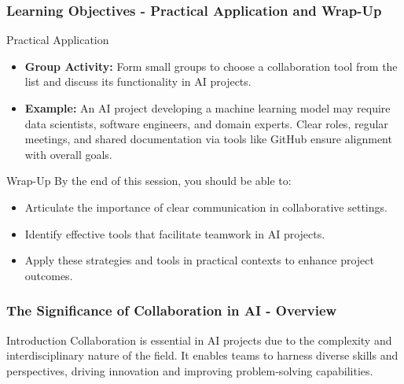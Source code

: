 \documentclass[aspectratio=169]{beamer}
\begin{document}
\begin{frame}[fragile]
    \frametitle{Learning Objectives - Practical Application and Wrap-Up}
    \begin{block}{Practical Application}
        \begin{itemize}
            \item \textbf{Group Activity:} Form small groups to choose a collaboration tool from the list and discuss its functionality in AI projects.
            \item \textbf{Example:} An AI project developing a machine learning model may require data scientists, software engineers, and domain experts. Clear roles, regular meetings, and shared documentation via tools like GitHub ensure alignment with overall goals.
        \end{itemize}
    \end{block}
    
    \begin{block}{Wrap-Up}
        By the end of this session, you should be able to:
        \begin{itemize}
            \item Articulate the importance of clear communication in collaborative settings.
            \item Identify effective tools that facilitate teamwork in AI projects.
            \item Apply these strategies and tools in practical contexts to enhance project outcomes.
        \end{itemize}
    \end{block}
\end{frame}

\begin{frame}[fragile]
    \frametitle{The Significance of Collaboration in AI - Overview}
    \begin{block}{Introduction}
        Collaboration is essential in AI projects due to the complexity and interdisciplinary nature of the field. It enables teams to harness diverse skills and perspectives, driving innovation and improving problem-solving capabilities.
    \end{block}
\end{frame}
\end{document}

